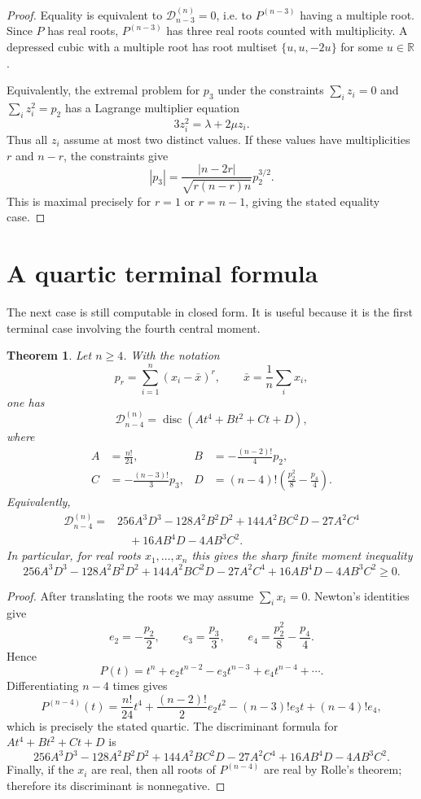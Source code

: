 \documentclass[11pt]{amsart}
\numberwithin{equation}{section}
\newtheorem{theorem}{Theorem}
\newcommand{\bR}{\mathbb R}
\newcommand{\D}{\mathcal D}
\newcommand{\disc}{\operatorname{disc}}
\begin{document}
\begin{proof}
Equality is equivalent to $\D_{n-3}^{(n)}=0$, i.e. to $P^{(n-3)}$ having a
multiple root.  Since $P$ has real roots, $P^{(n-3)}$ has three real roots
counted with multiplicity.  A depressed cubic with a multiple root has root
multiset $\{u,u,-2u\}$ for some $u\in\bR$.

Equivalently, the extremal problem for $p_3$ under the constraints
$\sum_i z_i=0$ and $\sum_i z_i^2=p_2$ has a Lagrange multiplier equation
\[
3z_i^2=\lambda+2\mu z_i.
\]
Thus all $z_i$ assume at most two distinct values.  If these values have
multiplicities $r$ and $n-r$, the constraints give
\[
|p_3|=\frac{|n-2r|}{\sqrt{r(n-r)n}}p_2^{3/2}.
\]
This is maximal precisely for $r=1$ or $r=n-1$, giving the stated equality
case.
\end{proof}

\section{A quartic terminal formula}

The next case is still computable in closed form.  It is useful because it
is the first terminal case involving the fourth central moment.

\begin{theorem}\label{thm:quartic}
Let $n\ge4$.  With the notation
\[
p_r=\sum_{i=1}^n (x_i-\bar x)^r ,
\qquad
\bar x=\frac1n\sum_i x_i ,
\]
one has
\[
\D_{n-4}^{(n)}
=\disc\left(
A t^4+B t^2+C t+D
\right),
\]
where
\[
\begin{aligned}
A&=\frac{n!}{24},
&B&=-\frac{(n-2)!}{4}p_2,\\
C&=-\frac{(n-3)!}{3}p_3,
&D&=(n-4)!\left(\frac{p_2^2}{8}-\frac{p_4}{4}\right).
\end{aligned}
\]
Equivalently,
\[
\begin{aligned}
\D_{n-4}^{(n)}
={}&256A^3D^3-128A^2B^2D^2+144A^2BC^2D-27A^2C^4\\
&\quad +16AB^4D-4AB^3C^2 .
\end{aligned}
\]
In particular, for real roots $x_1,\ldots,x_n$ this gives the sharp
finite moment inequality
\[
256A^3D^3-128A^2B^2D^2+144A^2BC^2D-27A^2C^4
+16AB^4D-4AB^3C^2\ge0 .
\]
\end{theorem}

\begin{proof}
After translating the roots we may assume $\sum_i x_i=0$.  Newton's identities
give
\[
e_2=-\frac{p_2}{2},\qquad
e_3=\frac{p_3}{3},\qquad
e_4=\frac{p_2^2}{8}-\frac{p_4}{4}.
\]
Hence
\[
P(t)=t^n+e_2t^{n-2}-e_3t^{n-3}+e_4t^{n-4}+\cdots .
\]
Differentiating $n-4$ times gives
\[
P^{(n-4)}(t)
=
\frac{n!}{24}t^4+\frac{(n-2)!}{2}e_2t^2
-(n-3)!e_3t+(n-4)!e_4,
\]
which is precisely the stated quartic.  The discriminant formula for
$At^4+Bt^2+Ct+D$ is
\[
256A^3D^3-128A^2B^2D^2+144A^2BC^2D-27A^2C^4
+16AB^4D-4AB^3C^2 .
\]
Finally, if the $x_i$ are real, then all roots of $P^{(n-4)}$ are real by
Rolle's theorem; therefore its discriminant is nonnegative.
\end{proof}
\end{document}
